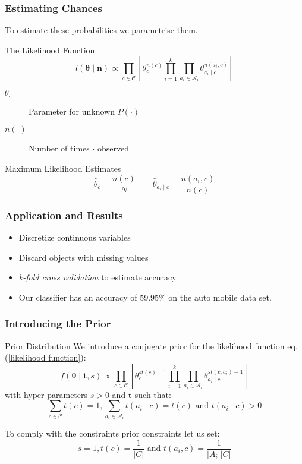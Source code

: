 \documentclass{beamer}
\begin{document}
\begin{frame}
	\frametitle{Estimating Chances}
	To estimate these probabilities we parametrise them.
	\begin{block}{The Likelihood Function}
		\begin{equation}\label{likelihood function}
			l(\mathbf{\theta} \mid \mathbf{n}) \propto \prod_{c \in \mathcal{C}} \left[ \theta_c^{n(c)} \prod_{i=1}^k \prod_{a_i \in \mathcal{A}_i} \theta_{a_i \mid c}^{n(a_i, c)} \right]
		\end{equation}
		\begin{description}
			\item[$\theta_\cdot$] Parameter for unknown $P(\cdot)$
			\item[$n(\cdot)$] Number of times $\cdot$ observed
		\end{description}
	\end{block}
	\begin{block}{Maximum Likelihood Estimates}
		\begin{equation}
			\hat{\theta}_c = \frac{n(c)}{N} \qquad \hat{\theta}_{a_i \mid c} = \frac{n(a_i, c)}{n(c)}
		\end{equation}
	\end{block}
\end{frame}

\begin{frame}
	\frametitle{Application and Results}
	\begin{itemize}
		\item Discretize continuous variables
		\item Discard objects with missing values
		\item \textit{k-fold cross validation} to estimate accuracy
		\item Our classifier has  an accuracy of 59.95\% on the auto mobile data set.
	\end{itemize}
\end{frame}

\begin{frame}
	\frametitle{Introducing the Prior}
	\begin{block}{Prior Distribution}
		We introduce a conjugate prior for the likelihood function eq. (\ref{likelihood function}):
		\begin{equation}
			f(\mathbf{\theta} \mid \mathbf{t}, s) \propto \prod_{c \in \mathcal{C}} \left[ \theta_c^{st(c) - 1} \prod_{i=1}^k \prod_{a_i \in \mathcal{A}_i} \theta_{a_i \mid c}^{st(c, a_i) - 1} \right]
		\end{equation}
		with hyper parameters $s>0$ and $\mathbf{t}$ such that:
		\begin{equation}
			\sum_{c \in \mathcal{C}} t(c) = 1, \sum_{a_i \in \mathcal{A}_i} t(a_i \mid c) = t(c) \text{ and } t(a_i \mid c) > 0
		\end{equation}
	\end{block}
	To comply with the constraints prior constraints let us set:
	\begin{equation}
		s = 1, t(c) = \frac{1}{|C|} \text{ and } t(a_i, c) = \frac{1}{|A_i||C|}
	\end{equation}
\end{frame}
\end{document}
